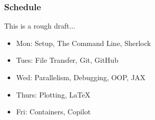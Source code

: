 \documentclass[aspectratio=169]{beamer}
\begin{document}
\begin{frame}
	\frametitle{Schedule}
	This is a rough draft...
	\begin{itemize}
		\item Mon: Setup, The Command Line, Sherlock
		\item Tues: File Transfer, Git, GitHub
		\item Wed: Parallelism, Debugging, OOP, JAX
		\item Thurs: Plotting, LaTeX
		\item Fri: Containers, Copilot
	\end{itemize}
\end{frame}
\end{document}

